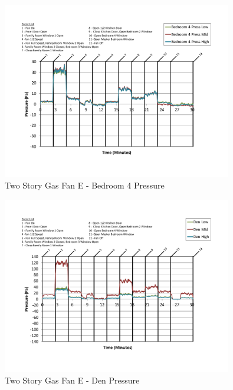 \documentclass{article}
\begin{document}
\begin{appendices}
	\begin{figure}[H]
		\centering
		\includegraphics[height=3.05in,trim=0.67in 1.1in 0.67in 0.8in,clip=true]{0_Images/Results_Charts/ColdFlow/Two_Story/Gas/E/Bedroom_4_Pressure.pdf}
		\caption{Two Story Gas Fan E - Bedroom 4 Pressure}
	\end{figure}
 

	\begin{figure}[H]
		\centering
		\includegraphics[height=3.05in,trim=0.67in 1.1in 0.67in 0.8in,clip=true]{0_Images/Results_Charts/ColdFlow/Two_Story/Gas/E/Den_Pressure.pdf}
		\caption{Two Story Gas Fan E - Den Pressure}
	\end{figure}
 
	\clearpage


\end{appendices}
\end{document}

